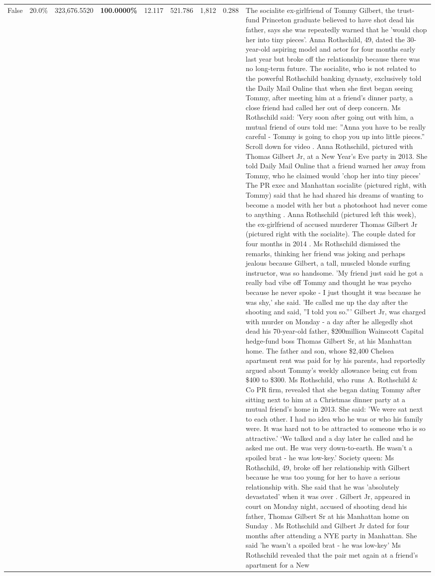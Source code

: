 \begin{table}[H]
\begin{tabular}{lllrlllll}
False & 20.0\% & 323,676.5520 & \bfseries \color{red} 100.0000\% & 12.117 & 521.786 & 1,812 & 0.288 & The socialite ex-girlfriend of Tommy Gilbert, the trust-fund Princeton graduate believed to have shot dead his father, says she was repeatedly warned that he 'would chop her into tiny pieces'. Anna Rothschild, 49, dated the 30-year-old aspiring model and actor for four months early last year but broke off the relationship because there was no long-term future. The socialite, who is not related to the powerful Rothschild banking dynasty, exclusively told the Daily Mail Online that when she first began seeing Tommy, after meeting him at a friend's dinner party, a close friend had called her out of deep concern. Ms Rothschild said: 'Very soon after going out with him, a mutual friend of ours told me: ''Anna you have to be really careful - Tommy is going to chop you up into little pieces.'' Scroll down for video . Anna Rothschild, pictured with Thomas Gilbert Jr, at a New Year's Eve party in 2013. She told Daily Mail Online that a friend warned her away from Tommy, who he claimed would 'chop her into tiny pieces' The PR exec and Manhattan socialite (pictured right, with Tommy) said that he had shared his dreams of wanting to become a model with her but a photoshoot had never come to anything . Anna Rothschild (pictured left this week), the ex-girlfriend of accused murderer Thomas Gilbert Jr (pictured right with the socialite). The couple dated for four months in 2014 . Ms Rothschild dismissed the remarks, thinking her friend was joking and perhaps jealous because Gilbert, a tall, muscled blonde surfing instructor, was so handsome. 'My friend just said he got a really bad vibe off Tommy and thought he was psycho because he never spoke - I just thought it was because he was shy,' she said. 'He called me up the day after the shooting and said, ''I told you so.''' Gilbert Jr, was charged with murder on Monday - a day after he allegedly shot dead his 70-year-old father, \$200million Wainscott Capital hedge-fund boss Thomas Gilbert Sr, at his Manhattan home. The father and son, whose \$2,400 Chelsea apartment rent was paid for by his parents, had reportedly argued about Tommy's weekly allowance being cut from \$400 to \$300. Ms Rothschild, who runs A. Rothschild \& Co PR firm, revealed that she began dating Tommy after sitting next to him at a Christmas dinner party at a mutual friend's home in 2013. She said: 'We were sat next to each other. I had no idea who he was or who his family were. It was hard not to be attracted to someone who is so attractive.' ‘We talked and a day later he called and he asked me out. He was very down-to-earth. He wasn’t a spoiled brat - he was low-key.’ Society queen: Ms Rothschild, 49, broke off her relationship with Gilbert because he was too young for her to have a serious relationship with. She said that he was 'absolutely devastated' when it was over . Gilbert Jr, appeared in court on Monday night, accused of shooting dead his father, Thomas Gilbert Sr at his Manhattan home on Sunday . Ms Rothschild and Gilbert Jr dated for four months after attending a NYE party in Manhattan. She said 'he wasn't a spoiled brat - he was low-key' Ms Rothschild revealed that the pair met again at a friend’s apartment for a New 
\end{tabular}
\end{table}

